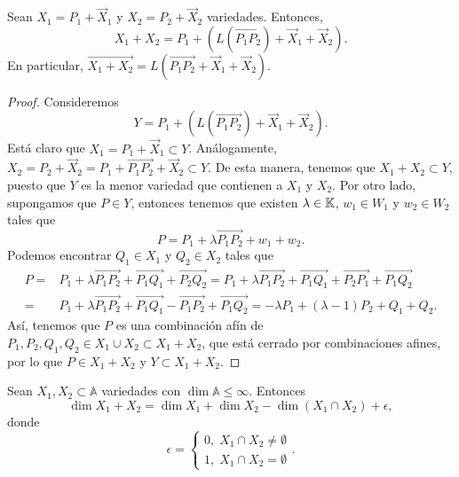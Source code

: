 \begin{lema}
Sean $\displaystyle X_{1} = P_{1} + \overrightarrow{X}_{1} $ y $\displaystyle X_{2} = P_{2} + \overrightarrow{X}_{2} $ variedades. Entonces, 
\[X_{1} + X_{2} = P_{1} + \left(L\left(\overrightarrow{P_{1}P_{2}}\right)+\overrightarrow{X}_{1} + \overrightarrow{X}_{2}\right) .\]
En particular, $\displaystyle \overrightarrow{X_{1}+X_{2}} = L\left(\overrightarrow{P_{1}P_{2}}+\overrightarrow{X}_{1}+\overrightarrow{X}_{2}\right)$.
\end{lema}
\begin{proof}
Consideremos 
\[ Y = P_{1} + \left(L\left(\overrightarrow{P_{1}P_{2}}\right)+\overrightarrow{X}_{1} + \overrightarrow{X}_{2}\right).\]
Está claro que $\displaystyle X_{1} = P_{1} + \overrightarrow{X}_{1} \subset Y $. Análogamente, $\displaystyle X_{2} = P_{2} + \overrightarrow{X}_{2} = P_{1}+\overrightarrow{P_{1}P_{2}} + \overrightarrow{X}_{2} \subset Y $. De esta manera, tenemos que $\displaystyle X_{1} + X_{2} \subset Y $, puesto que $\displaystyle Y $ es la menor variedad que contienen a $\displaystyle X_{1} $ y $\displaystyle X_{2} $.
Por otro lado, supongamos que $\displaystyle P \in Y $, entonces tenemos que existen $\displaystyle \lambda \in \mathbb{K} $, $\displaystyle w_{1} \in W_{1} $ y $\displaystyle w_{2} \in W_{2}$ tales que
\[P = P_{1} + \lambda \overrightarrow{P_{1}P_{2}} + w_{1} + w_{2} .\]
Podemos encontrar $\displaystyle Q_{1} \in X_{1} $ y $\displaystyle Q_{2} \in X_{2} $ tales que
\[
\begin{split}
	P = & P_{1} +\lambda\overrightarrow{P_{1}P_{2}} + \overrightarrow{P_{1}Q_{1}} + \overrightarrow{P_{2}Q_{2}} = P_{1} + \lambda \overrightarrow{P_{1}P_{2}} + \overrightarrow{P_{1}Q_{1}} + \overrightarrow{P_{2}P_{1}} + \overrightarrow{P_{1}Q_{2}} \\
	= & P_{1} + \lambda\overrightarrow{P_{1}P_{2}} + \overrightarrow{P_{1}Q_{1}} - \overrightarrow{P_{1}P_{2}} + \overrightarrow{P_{1}Q_{2}} = -\lambda P_{1} + \left(\lambda - 1\right)P_{2} + Q_{1}+Q_{2}.
\end{split}
\]
Así, tenemos que $\displaystyle P $ es una combinación afín de $\displaystyle P_{1}, P_{2}, Q_{1}, Q_{2} \in X_{1} \cup X_{2} \subset X_{1} + X_{2} $, que está cerrado por combinaciones afines, por lo que $\displaystyle P \in X_{1} + X_{2} $ y $\displaystyle Y \subset X_{1} + X_{2} $.
\end{proof}
\begin{theorem}
Sean $\displaystyle X_{1}, X_{2} \subset \mathbb{A} $ variedades con $\displaystyle \dim\mathbb{A}\leq \infty $. Entonces
\[\dim X_{1} + X_{2} = \dim X_{1} + \dim X_{2} - \dim \left(X_{1} \cap X_{2}\right) + \epsilon ,\]
donde 
\[\epsilon = 
\begin{cases}
0, \; X_{1} \cap X_{2} \neq \emptyset \\ 
1, \; X_{1} \cap X_{2} = \emptyset
\end{cases}
.\]
\end{theorem}
